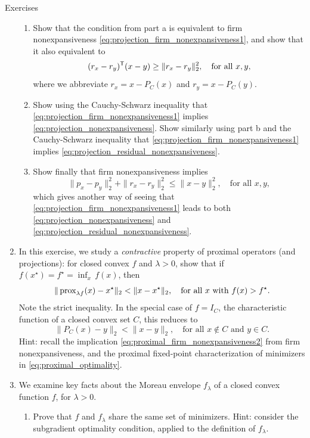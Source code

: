 \begin{xcb}{Exercises}
\begin{enumerate}[label=\thechapter.\arabic*]
\begin{enumerate}[label=\alph*.]
\item Show that the condition from part a is equivalent to firm nonexpansiveness 
  \eqref{eq:projection_firm_nonexpansiveness1}, and show that it also equivalent
  to   
  \[
  (r_x - r_y)^{\mathsf{T}} (x - y) \geq \|r_x - r_y\|_2^2, \quad \text{for all $x,y$},
  \]
  where we abbreviate $r_x = x - P_C(x)$ and $r_y = x - P_C(y)$.

\item Show using the Cauchy-Schwarz inequality that
  \eqref{eq:projection_firm_nonexpansiveness1} implies
  \eqref{eq:projection_nonexpansiveness}. Show similarly using part b and the
  Cauchy-Schwarz inequality that \eqref{eq:projection_firm_nonexpansiveness1}
  implies \eqref{eq:projection_residual_nonexpansiveness}.

\item Show finally that firm nonexpansiveness implies 
  \[
  \|p_x - p_y\|_2^2 + \|r_x - r_y\|_2^2 \leq \|x - y\|_2^2, \quad \text{for all
    $x,y$},
  \]
  which gives another way of seeing that
  \eqref{eq:projection_firm_nonexpansiveness1} leads to both
  \eqref{eq:projection_nonexpansiveness} and
  \eqref{eq:projection_residual_nonexpansiveness}. 
\end{enumerate}

\item In this exercise, we study a \emph{contractive} property of proximal
  operators (and projections): for closed convex $f$ and $\lambda > 0$, show
  that if $f(x^\star) = f^\star = \inf_x \, f(x)$, then   
  \[
  \| \operatorname{prox}_{\lambda f}(x) - x^\star\|_2 < \|x - x^\star\|_2, \quad \text{for
    all $x$ with $f(x) > f^\star$}.
  \]
  Note the strict inequality. In the special case of $f = I_C$, the
  characteristic function of a closed convex set $C$, this reduces to 
  \[
  \| P_C(x) - y\|_2 < \|x - y\|_2, \quad \text{for all $x \notin C$ and $y \in
    C$}.    
  \]
  Hint: recall the implication \eqref{eq:proximal_firm_nonexpansiveness2} from
  firm nonexpansiveness, and the proximal fixed-point characterization of 
  minimizers in \eqref{eq:proximal_optimality}.  

\item \label{ex:moreau_envelope}
  We examine key facts about the Moreau envelope $f_\lambda$ of a closed convex
  function $f$, for $\lambda > 0$. 

\begin{enumerate}[label=\alph*.]
\item Prove that $f$ and $f_\lambda$ share the same set of minimizers. Hint: 
  consider the subgradient optimality condition, applied to the definition of 
  $f_\lambda$. 


\end{enumerate}
\end{enumerate}
\end{xcb}
